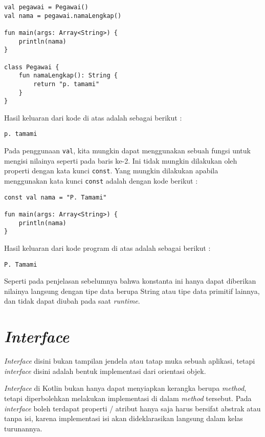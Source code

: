 \begin{lstlisting}
val pegawai = Pegawai()
val nama = pegawai.namaLengkap()

fun main(args: Array<String>) {
	println(nama)
}

class Pegawai {
	fun namaLengkap(): String {
		return "p. tamami"
	}
}
\end{lstlisting}

Hasil keluaran dari kode di atas adalah sebagai berikut :

\begin{lstlisting}
p. tamami
\end{lstlisting}

Pada penggunaan \texttt{val}, kita mungkin dapat menggunakan sebuah fungsi untuk mengisi nilainya seperti pada baris ke-2. Ini tidak mungkin dilakukan oleh properti dengan kata kunci \texttt{const}. Yang mungkin dilakukan apabila menggunakan kata kunci \texttt{const} adalah dengan kode berikut :

\begin{lstlisting}
const val nama = "P. Tamami"

fun main(args: Array<String>) {
	println(nama)
}
\end{lstlisting}

Hasil keluaran dari kode program di atas adalah sebagai berikut :

\begin{lstlisting}
P. Tamami
\end{lstlisting}

Seperti pada penjelasan sebelumnya bahwa konstanta ini hanya dapat diberikan nilainya langsung dengan tipe data berupa String atau tipe data primitif lainnya, dan tidak dapat diubah pada saat \textit{runtime}.

\section{\textit{Interface}}

\textit{Interface} disini bukan tampilan jendela atau tatap muka sebuah aplikasi, tetapi \textit{interface} disini adalah bentuk implementasi dari orientasi objek. 

\textit{Interface} di Kotlin bukan hanya dapat menyiapkan kerangka berupa \textit{method}, tetapi diperbolehkan melakukan implementasi di dalam \textit{method} tersebut. Pada \textit{interface} boleh terdapat properti / atribut hanya saja harus bersifat abstrak atau tanpa isi, karena implementasi isi akan dideklarasikan langsung dalam kelas turunannya.

